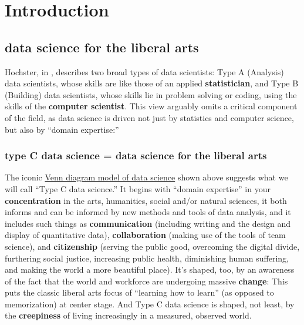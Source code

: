 \documentclass[openany]{book}
\begin{document}
\hypertarget{part-introduction}{%
\part{Introduction}\label{part-introduction}}

\hypertarget{data-science-for-the-liberal-arts}{%
\chapter{data science for the liberal arts}\label{data-science-for-the-liberal-arts}}

Hochster, in \citet{hicks2017guide}, describes two broad types of data scientists: Type A (Analysis) data scientists, whose skills are like those of an applied \textbf{statistician}, and Type B (Building) data scientists, whose skills lie in problem solving or coding, using the skills of the \textbf{computer scientist}. This view arguably omits a critical component of the field, as data science is driven not just by statistics and computer science, but also by ``domain expertise:''

\hypertarget{type-c-data-science-data-science-for-the-liberal-arts}{%
\section{type C data science = data science for the liberal arts}\label{type-c-data-science-data-science-for-the-liberal-arts}}

The iconic \href{https://www.google.com/search?q=venn+diagram+model+of+data+science\&newwindow=1\&safe=active\&rlz=1C1CHBF_enUS762US763\&tbm=isch\&tbo=u\&source=univ\&sa=X\&ved=0ahUKEwiM_abBtY7XAhXDQCYKHdgyB58QsAQIOg\&biw=1378}{Venn diagram model of data science} shown above suggests what we will call ``Type C data science.'' It begins with ``domain expertise'' in your \textbf{concentration} in the arts, humanities, social and/or natural sciences, it both informs and can be informed by new methods and tools of data analysis, and it includes such things as \textbf{communication} (including writing and the design and display of quantitative data), \textbf{collaboration} (making use of the tools of team science), and \textbf{citizenship} (serving the public good, overcoming the digital divide, furthering social justice, increasing public health, diminishing human suffering, and making the world a more beautiful place). It's shaped, too, by an awareness of the fact that the world and workforce are undergoing massive \textbf{change}: This puts the classic liberal arts focus of ``learning how to learn'' (as opposed to memorization) at center stage. And Type C data science is shaped, not least, by the \textbf{creepiness} of living increasingly in a measured, observed world.
\end{document}
